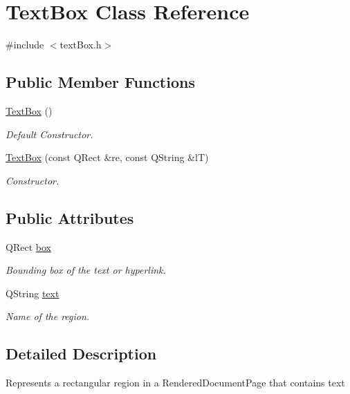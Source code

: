 \hypertarget{classTextBox}{\section{Text\+Box Class Reference}
\label{classTextBox}
}


{\ttfamily \#include $<$text\+Box.\+h$>$}

\subsection*{Public Member Functions}
\begin{DoxyCompactItemize}
\item 
\hyperlink{classTextBox_a25b67e5ff6788c60b8aef3f3540879d0}{Text\+Box} ()
\begin{DoxyCompactList}\small\item\em Default Constructor. \end{DoxyCompactList}\item 
\hyperlink{classTextBox_a64a5cc01b2ef42639037cbd0247361f6}{Text\+Box} (const Q\+Rect \&re, const Q\+String \&l\+T)
\begin{DoxyCompactList}\small\item\em Constructor. \end{DoxyCompactList}\end{DoxyCompactItemize}
\subsection*{Public Attributes}
\begin{DoxyCompactItemize}
\item 
Q\+Rect \hyperlink{classTextBox_aa383110556fc2ca0e787b9618a333074}{box}
\begin{DoxyCompactList}\small\item\em Bounding box of the text or hyperlink. \end{DoxyCompactList}\item 
Q\+String \hyperlink{classTextBox_a60aeb0b354c3e92da942f3fac174da2e}{text}
\begin{DoxyCompactList}\small\item\em Name of the region. \end{DoxyCompactList}\end{DoxyCompactItemize}


\subsection{Detailed Description}
Represents a rectangular region in a Rendered\+Document\+Page that contains text

